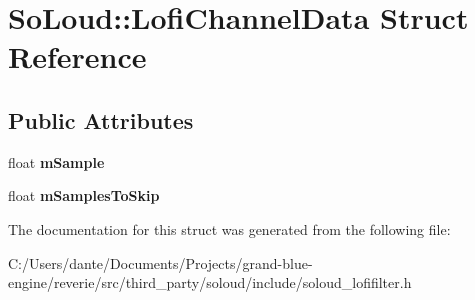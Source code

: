 \hypertarget{struct_so_loud_1_1_lofi_channel_data}{}\section{So\+Loud\+::Lofi\+Channel\+Data Struct Reference}
\label{struct_so_loud_1_1_lofi_channel_data}
\subsection*{Public Attributes}
\begin{DoxyCompactItemize}
\item 
\mbox{\label{struct_so_loud_1_1_lofi_channel_data_ae11de05f305ae215b5f9256e42970819}} 
float {\bfseries m\+Sample}
\item 
\mbox{\label{struct_so_loud_1_1_lofi_channel_data_abefcb30d3db32987f2e18f587475fe89}} 
float {\bfseries m\+Samples\+To\+Skip}
\end{DoxyCompactItemize}


The documentation for this struct was generated from the following file\+:\begin{DoxyCompactItemize}
\item 
C\+:/\+Users/dante/\+Documents/\+Projects/grand-\/blue-\/engine/reverie/src/third\+\_\+party/soloud/include/soloud\+\_\+lofifilter.\+h\end{DoxyCompactItemize}
